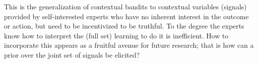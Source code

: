This is the generalization of contextual bandits to contextual variables (signals) provided by self-interested experts who have no inherent interest in the outcome or action, but need to be incentivized to be truthful. 
To the degree the experts know how to interpret the (full set) learning to do it is inefficient. 
How to incorporate this appears as a fruitful avenue for future research; that is how can a prior over the joint set of signals be elicited? 











	




